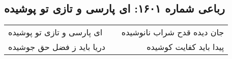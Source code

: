 \begin{center}
\section*{رباعی شماره ۱۶۰۱: ای پارسی و تازی تو پوشیده}
\label{sec:1601}
\begin{longtable}{l p{0.5cm} r}
ای پارسی و تازی تو پوشیده
&&
جان دیده قدح شراب نانوشیده
\\
دریا باید ز فضل حق جوشیده
&&
پیدا باید کفایت کوشیده
\\
\end{longtable}
\end{center}
